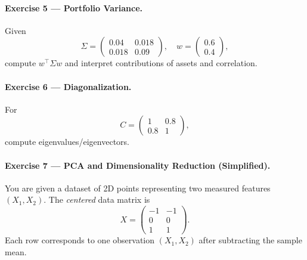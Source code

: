 \documentclass[11pt]{article}
\begin{document}
\paragraph{Exercise 5 — Portfolio Variance.}
Given 
\[
\Sigma = \begin{pmatrix} 0.04 & 0.018 \\ 0.018 & 0.09 \end{pmatrix},\quad 
w=\begin{pmatrix}0.6\\0.4\end{pmatrix},
\]
compute $w^\top \Sigma w$ and interpret contributions of assets and correlation.

\paragraph{Exercise 6 — Diagonalization.}
For 
\[
C=\begin{pmatrix}1 & 0.8\\ 0.8 & 1\end{pmatrix},
\]
compute eigenvalues/eigenvectors.


\paragraph{Exercise 7 — PCA and Dimensionality Reduction (Simplified).}

You are given a dataset of 2D points representing two measured features $(X_1, X_2)$.
The \emph{centered} data matrix is
\[
X =
\begin{pmatrix}
-1 & -1 \\
0 & 0 \\
1 & 1
\end{pmatrix}.
\]
Each row corresponds to one observation $(X_1, X_2)$ after subtracting the sample mean.
\end{document}
